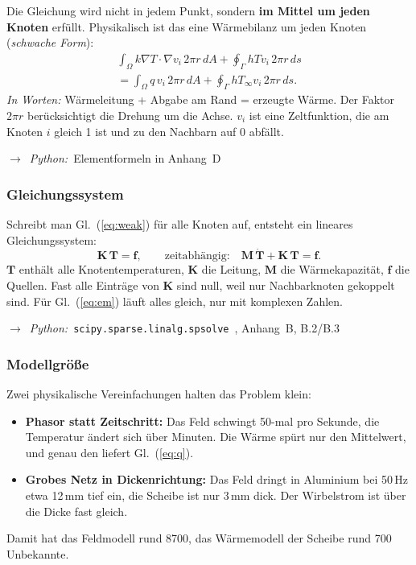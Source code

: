 \documentclass[a4paper, 10pt, conference]{ieeeconf}
\newcommand{\py}[1]{\par{\raggedright\noindent$\rightarrow$~\textit{Python:}~#1\par}\smallskip}
\begin{document}
Die Gleichung wird nicht in jedem Punkt, sondern \textbf{im Mittel um jeden
Knoten} erfüllt. Physikalisch ist das eine Wärmebilanz um jeden Knoten
(\textit{schwache Form}):
\begin{multline}
\int_\Omega k\nabla T\cdot\nabla v_i\,2\pi r\,dA + \oint_\Gamma hTv_i\,2\pi r\,ds \\
= \int_\Omega q\,v_i\,2\pi r\,dA+\oint_\Gamma hT_\infty v_i\,2\pi r\,ds .
\label{eq:weak}
\end{multline}
\textit{In Worten:} Wärmeleitung + Abgabe am Rand = erzeugte Wärme. Der
Faktor $2\pi r$ berücksichtigt die Drehung um die Achse. $v_i$ ist eine
\glqq Zeltfunktion\grqq{}, die am Knoten $i$ gleich 1 ist und zu den
Nachbarn auf 0 abfällt.
\py{Elementformeln in Anhang~D}

\subsubsection{Gleichungssystem}
Schreibt man Gl.~(\ref{eq:weak}) für alle Knoten auf, entsteht ein lineares
Gleichungssystem:
\begin{equation}
\mathbf K\,\mathbf T=\mathbf f,\qquad\text{zeitabhängig:}\quad
\mathbf M\,\dot{\mathbf T}+\mathbf K\,\mathbf T=\mathbf f .
\label{eq:lin}
\end{equation}
$\mathbf T$ enthält alle Knotentemperaturen, $\mathbf K$ die Leitung,
$\mathbf M$ die Wärmekapazität, $\mathbf f$ die Quellen. Fast alle Einträge
von $\mathbf K$ sind null, weil nur Nachbarknoten gekoppelt sind. Für
Gl.~(\ref{eq:em}) läuft alles gleich, nur mit komplexen Zahlen.
\py{\texttt{scipy.sparse.linalg.spsolve}~\cite{virtanen2020scipy}, Anhang~B, B.2/B.3}

\subsubsection{Modellgröße}
Zwei physikalische Vereinfachungen halten das Problem klein:
\begin{itemize}[leftmargin=*]
  \item \textbf{Phasor statt Zeitschritt:} Das Feld schwingt 50-mal pro
        Sekunde, die Temperatur ändert sich über Minuten. Die Wärme spürt nur
        den Mittelwert, und genau den liefert Gl.~(\ref{eq:q}).
  \item \textbf{Grobes Netz in Dickenrichtung:} Das Feld dringt in Aluminium
        bei 50\,Hz etwa 12\,mm tief ein, die Scheibe ist nur 3\,mm dick. Der
        Wirbelstrom ist über die Dicke fast gleich.
\end{itemize}
Damit hat das Feldmodell rund 8700, das Wärmemodell der Scheibe rund 700
Unbekannte.
\end{document}
